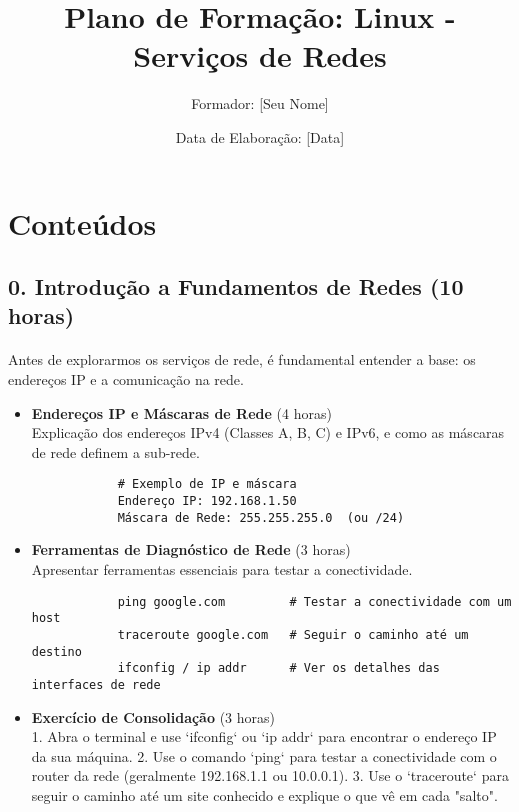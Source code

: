 \documentclass[10pt,a4paper]{article}
\title{Plano de Formação: Linux - Serviços de Redes}
\author{Formador: [Seu Nome]}
\date{Data de Elaboração: [Data]}
\begin{document}
	
	\section*{Conteúdos}
	
	\subsection*{0. Introdução a Fundamentos de Redes (10 horas)}
	\vspace{-1.2em}
	\paragraph{}
	Antes de explorarmos os serviços de rede, é fundamental entender a base: os endereços IP e a comunicação na rede.
	
	\begin{itemize}
		\item \textbf{Endereços IP e Máscaras de Rede} (4 horas) \\
		Explicação dos endereços IPv4 (Classes A, B, C) e IPv6, e como as máscaras de rede definem a sub-rede.
		\begin{verbatim}
			# Exemplo de IP e máscara
			Endereço IP: 192.168.1.50
			Máscara de Rede: 255.255.255.0  (ou /24)
		\end{verbatim}
		
		\item \textbf{Ferramentas de Diagnóstico de Rede} (3 horas) \\
		Apresentar ferramentas essenciais para testar a conectividade.
		\begin{verbatim}
			ping google.com         # Testar a conectividade com um host
			traceroute google.com   # Seguir o caminho até um destino
			ifconfig / ip addr      # Ver os detalhes das interfaces de rede
		\end{verbatim}
		
		\item \textbf{Exercício de Consolidação} (3 horas) \\
		1. Abra o terminal e use `ifconfig` ou `ip addr` para encontrar o endereço IP da sua máquina.
		2. Use o comando `ping` para testar a conectividade com o router da rede (geralmente 192.168.1.1 ou 10.0.0.1).
		3. Use o `traceroute` para seguir o caminho até um site conhecido e explique o que vê em cada "salto".
	\end{itemize}
	
\end{document}
